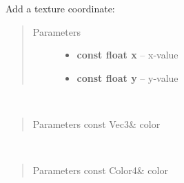 \documentclass[letterpaper,10pt,english]{sphinxmanual}
\begin{document}

\begin{fulllineitems}
\label{gl:VertexData::addTexCoord__floatC.floatC}
Add a texture coordinate:
\begin{quote}\begin{description}
\item[{Parameters}] \leavevmode\begin{itemize}
\item {} 
\textbf{const float x} -- x-value

\item {} 
\textbf{const float y} -- y-value

\end{itemize}

\end{description}\end{quote}

\end{fulllineitems}


\begin{fulllineitems}
\label{gl:VertexData::addColor__Vec3CR}~\begin{quote}\begin{description}
\item[{Parameters const Vec3\& color}] \leavevmode


\end{description}\end{quote}

\end{fulllineitems}


\begin{fulllineitems}
\label{gl:VertexData::addColor__Color4CR}~\begin{quote}\begin{description}
\item[{Parameters const Color4\& color}] \leavevmode


\end{description}\end{quote}

\end{fulllineitems}
\end{document}
